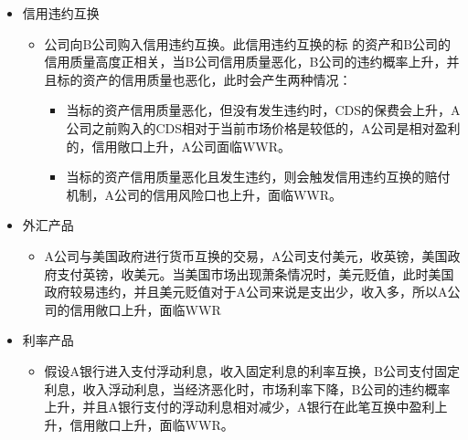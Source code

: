 \begin{itemize}
\begin{itemize}
        \item 信用违约互换
        \begin{itemize}
            \item 公司向B公司购入信用违约互换。此信用违约互换的标
            的资产和B公司的信用质量高度正相关，当B公司信用质量恶化，B公司的违约概率上升，并且标的资产的信用质量也恶化，此时会产生两种情况：
            \begin{itemize}
                \item 当标的资产信用质量恶化，但没有发生违约时，CDS的保费会上升，A公司之前购入的CDS相对于当前市场价格是较低的，A公司是相对盈利的，信用敞口上升，A公司面临WWR。
                \item 当标的资产信用质量恶化且发生违约，则会触发信用违约互换的赔付机制，A公司的信用风险口也上升，面临WWR。
            \end{itemize}
        \end{itemize}

        \item 外汇产品
        \begin{itemize}
            \item A公司与美国政府进行货币互换的交易，A公司支付美元，收英镑，美国政府支付英镑，收美元。当美国市场出现萧条情况时，美元贬值，此时美国政府较易违约，并且美元贬值对于A公司来说是支出少，收入多，所以A公司的信用敞口上升，面临WWR
        \end{itemize}
        \item 利率产品
        \begin{itemize}
            \item 假设A银行进入支付浮动利息，收入固定利息的利率互换，B公司支付固定利息，收入浮动利息，当经济恶化时，市场利率下降，B公司的违约概率上升，并且A银行支付的浮动利息相对减少，A银行在此笔互换中盈利上升，信用敞口上升，面临WWR。
        \end{itemize}
    \end{itemize}




\end{itemize}
